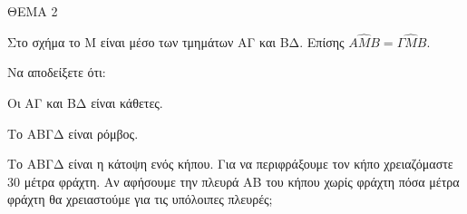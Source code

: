 
ΘΕΜΑ 2

Στο σχήμα το Μ είναι μέσο των τμημάτων ΑΓ και ΒΔ. Επίσης $Α\widehat{Μ}Β = \Gamma\widehat{Μ}Β$.

\begin{alist}
\item Να αποδείξετε ότι:

\begin{rlist}
\item Οι ΑΓ και ΒΔ είναι κάθετες. 

\item Το ΑΒΓΔ είναι ρόμβος. 

\end{rlist}
\item Το ΑΒΓΔ είναι η κάτοψη ενός κήπου. Για να περιφράξουμε τον κήπο χρειαζόμαστε 30 μέτρα φράχτη. Αν αφήσουμε την πλευρά ΑΒ του κήπου χωρίς φράχτη πόσα μέτρα φράχτη θα χρειαστούμε για τις υπόλοιπες πλευρές;



\end{alist}

